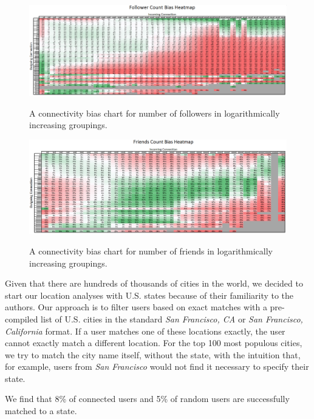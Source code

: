 \begin{figure}[t]
 \centering
 \includegraphics[bb=0 0 1025 364, scale=.4]{./images/Bates-Final/followercount.png}
 \label{fig:follower_count}
 \caption{A connectivity bias chart for number of followers in logarithmically increasing groupings.}
\end{figure}

\begin{figure}[t]
 \centering
 \includegraphics[bb=0 0 1027 377, scale=.4]{./images/Bates-Final/friendscount.png}
 \label{fig:friend_count}
 \caption{A connectivity bias chart for number of friends in logarithmically increasing groupings.}
\end{figure}

Given that there are hundreds of thousands of cities in the world, we decided to start our location analyses with U.S. states because of their familiarity to the authors.  Our approach is to filter users based on exact matches with a pre-compiled list of U.S. cities in the standard \textit{San Francisco, CA} or \textit{San Francisco, California} format.  If a user matches one of these locations exactly, the user cannot exactly match a different location.  For the top 100 most populous cities, we try to match the city name itself, without the state, with the intuition that, for example, users from \textit{San Francisco} would not find it necessary to specify their state.

We find that 8\% of connected users and 5\% of random users are successfully matched to a state.
